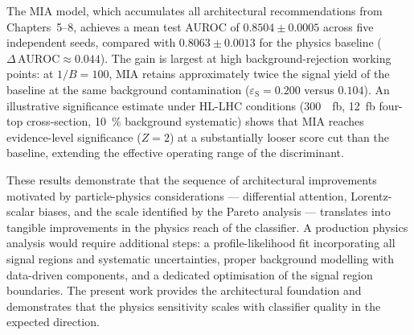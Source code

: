 The MIA model, which accumulates all architectural recommendations from Chapters~5–8,
achieves a mean test AUROC of $\num{0.8504} \pm \num{0.0005}$ across five independent
seeds, compared with $\num{0.8063} \pm \num{0.0013}$ for the physics baseline
($\Delta\,\mathrm{AUROC} \approx \num{0.044}$). The gain is largest at high
background-rejection working points: at $1/B = 100$, MIA retains approximately twice
the signal yield of the baseline at the same background contamination ($\varepsilon_{\mathrm{S}}
= \num{0.200}$ versus $\num{0.104}$). An illustrative significance estimate under
HL-LHC conditions (\SI{300}{\per\femto\barn}, \SI{12}{\femto\barn} four-top cross-section,
\SI{10}{\percent} background systematic) shows that MIA reaches evidence-level
significance ($Z = 2$) at a substantially looser score cut than the baseline,
extending the effective operating range of the discriminant.

These results demonstrate that the sequence of architectural improvements motivated by
particle-physics considerations — differential attention, Lorentz-scalar biases, and
the scale identified by the Pareto analysis — translates into tangible improvements in
the physics reach of the classifier. A production physics analysis would require
additional steps: a profile-likelihood fit incorporating all signal regions and
systematic uncertainties, proper background modelling with data-driven components,
and a dedicated optimisation of the signal region boundaries. The present work
provides the architectural foundation and demonstrates that the physics sensitivity
scales with classifier quality in the expected direction.
